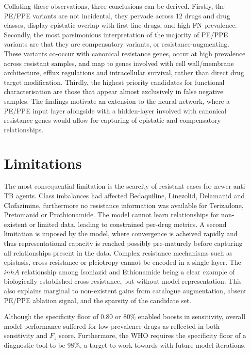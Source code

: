 Collating these observations, three conclusions can be derived. Firstly, the PE/PPE variants are not incidental, they pervade across 12 drugs and drug classes, display epistatic overlap with first-line drugs, and high FN prevalence. Secondly, the most parsimonious interpretation of the majority of PE/PPE variants are that they are compensatory variants, or resistance-augmenting. These variants co-occur with canonical resistance genes, occur at high prevalence across resistant samples, and map to genes involved with cell wall/membrane architecture, efflux regulations and intracellular survival, rather than direct drug target modification. Thirdly, the highest priority candidates for functional characterisation are those that appear almost exclusively in false negative samples. The findings motivate an extension to the neural network, where a PE/PPE input layer alongside with a hidden-layer involved with canonical resistance genes would allow for capturing of epistatic and compensatory relationships. 

\section{Limitations}
The most consequential limitation is the scarcity of resistant cases for newer anti-TB agents. Class imbalances had affected Bedaquiline, Linezolid, Delamanid and Clofazimine, furthermore no resistance information was available for Terizadone, Pretomanid or Prothionamide. The model cannot learn relationships for non-existent or limited data, leading to constrained per-drug metrics. A second limitation is imposed by the model, where convergence is acheived rapidly and thus representational capacity is reached possibly pre-maturely before capturing all relationships present in the data. Complex resistance mechanisms such as epistasis, cross-resistance or pleiotropy cannot be encoded in a single layer. The $inhA$ relationship among Isoniazid and Ethionamide being a clear example of biologically established cross-resistance, but without model representation. This also explains marginal to non-existent gains from catalogue augmentation, absent PE/PPE ablation signal, and the sparsity of the candidate set. 

Although the specificity floor of 0.80 or 80\% enabled boosts in sensitivity, overall model performance suffered for low-prevalence drugs as reflected in both sensitivity and $F_{1}$ score. Furthermore, the WHO requires the specificity floor of a diagnostic tool to be 98\%, a target to work towards with future model iterations. 

